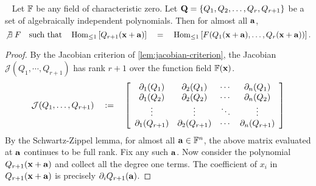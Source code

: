 \begin{lemma}~\label{lem:using algebraic dependence-converse} Let $\mathbb{F}$ be any field of characteristic zero.
Let $\mathbf{Q} = \left\{Q_1, Q_2, \ldots, Q_r,Q_{r+1}\right\}$ be a set of algebraically independent polynomials.
Then for almost all $\mathbf{a}$,
\[
\not\exists \; F \quad \text{such that} \quad \operatorname{Hom}_{\leq 1}\left[Q_{r+1}(\mathbf{x} + \mathbf{a})\right] \quad = \quad \operatorname{Hom}_{\leq 1}\left[F(Q_1(\mathbf{x} + \mathbf{a}), \ldots, Q_r(\mathbf{x} + \mathbf{a}))\right].
\]
\end{lemma}
\begin{proof}
By the Jacobian criterion of \autoref{lem:jacobian-criterion}, the Jacobian $\mathcal{J}(Q_1,\cdots, Q_{r+1})$ has rank $r+1$ over the function field $\mathbb{F}(\mathbf{x})$. 
\[
\mathcal{J}(Q_1,\ldots, Q_{r+1}) \quad := \quad \left[\begin{array}{cccc}
\partial_1(Q_1) & \partial_2(Q_1) & \cdots & \partial_n(Q_1)\\
\partial_1(Q_2) & \partial_2(Q_2) & \cdots & \partial_n(Q_2)\\
\vdots & \vdots & \ddots & \vdots\\
\partial_1(Q_{r+1}) & \partial_2(Q_{r+1}) & \cdots & \partial_n(Q_{r+1})
                                          \end{array}\right]                                          
\]
By the Schwartz-Zippel lemma, for almost all $\mathbf{a} \in \mathbb{F}^n$, the above matrix evaluated at $\mathbf{a}$ continues to be full rank. Fix any such $\mathbf{a}$. Now consider the polynomial $Q_{r+1}(\mathbf{x} + \mathbf{a})$ and collect all the degree one terms. The coefficient of $x_i$ in $Q_{r+1}(\mathbf{x} + \mathbf{a})$ is precisely $\partial_i Q_{r+1}(\mathbf{a})$. 


\end{proof}
